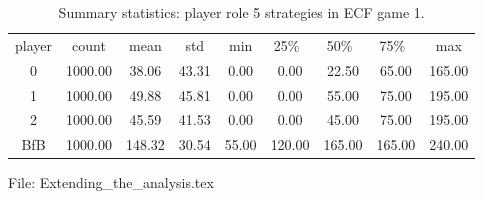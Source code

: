 \documentclass[11pt, oneside]{article}   	%
\begin{document}
\begin{table}[h]
\figtop

\centering
\begin{tabular}{ccccccccc}
 player & count & mean & std & min & 25\%\ & 50\%\ & 75\%\ & max \\ 
0 & 1000.00 & 38.06 & 43.31 & 0.00 & 0.00 & 22.50 & 65.00 & 165.00 \\ 
1 & 1000.00 & 49.88 & 45.81 & 0.00 & 0.00 & 55.00 & 75.00 & 195.00 \\ 
2 & 1000.00 & 45.59 & 41.53 & 0.00 & 0.00 & 45.00 & 75.00 & 195.00 \\ 
BfB & 1000.00 & 148.32 & 30.54 & 55.00 & 120.00 & 165.00 & 165.00 & 240.00 \\ 
 \end{tabular}
\caption{Summary statistics: player role 5 strategies in ECF game 1.}
\label{table:summary_game1_role5}
\figbot
\end{table}

\newpage\clearpage


\ifnum{}
\vfill
\noindent File: Extending\_the\_analysis.tex
\fi
\end{document}
